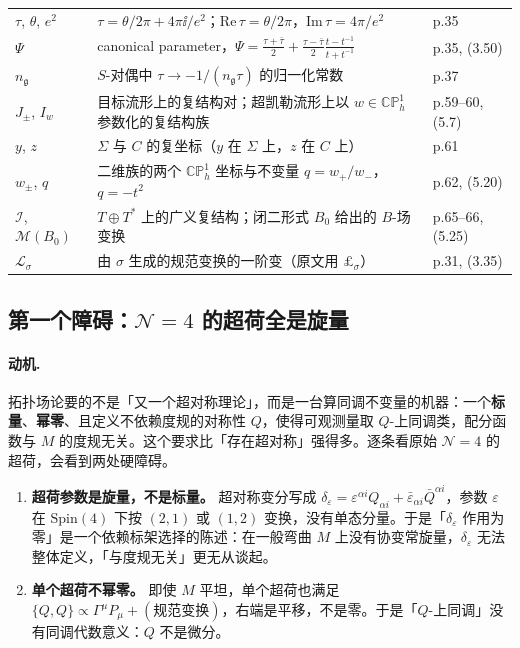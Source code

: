 {\begin{longtable}{@{}p{2.45cm}p{9.55cm}p{3.35cm}@{}}
$\tau$, $\theta$, $e^2$ & $\tau=\theta/2\pi+4\pi\ii/e^2$；$\mathrm{Re}\,\tau=\theta/2\pi$，$\mathrm{Im}\,\tau=4\pi/e^2$ & p.35\\
$\Psi$ & canonical parameter，$\Psi=\tfrac{\tau+\bar\tau}{2}+\tfrac{\tau-\bar\tau}{2}\tfrac{t-t^{-1}}{t+t^{-1}}$ & p.35, (3.50)\\
$n_{\mathfrak g}$ & $S$-对偶中 $\tau\to-1/(n_{\mathfrak g}\tau)$ 的归一化常数 & p.37\\
$J_\pm$, $I_w$ & 目标流形上的复结构对；超凯勒流形上以 $w\in\mathbb{CP}^1_h$ 参数化的复结构族 & p.59–60, (5.7)\\
$y$, $z$ & $\Sigma$ 与 $C$ 的复坐标（$y$ 在 $\Sigma$ 上，$z$ 在 $C$ 上） & p.61\\
$w_\pm$, $q$ & 二维族的两个 $\mathbb{CP}^1_h$ 坐标与不变量 $q=w_+/w_-$，$q=-t^2$ & p.62, (5.20)\\
$\mathcal I$, $\mathcal M(B_0)$ & $T\oplus T^*$ 上的广义复结构；闭二形式 $B_0$ 给出的 $B$-场变换 & p.65–66, (5.25)\\
$\mathcal L_\sigma$ & 由 $\sigma$ 生成的规范变换的一阶变（原文用 $\pounds_\sigma$） & p.31, (3.35)\\
\bottomrule
\end{longtable}
}

\subsection{第一个障碍：$\mathcal N=4$ 的超荷全是旋量}

\paragraph{动机.}
拓扑场论要的不是「又一个超对称理论」，而是一台算同调不变量的机器：一个\textbf{标量}、\textbf{幂零}、且定义不依赖度规的对称性 $Q$，使得可观测量取 $Q$-上同调类，配分函数与 $M$ 的度规无关。这个要求比「存在超对称」强得多。逐条看原始 $\mathcal N=4$ 的超荷，会看到两处硬障碍\pC。

\begin{enumerate}[label=(\arabic*)]
\item \textbf{超荷参数是旋量，不是标量。} 超对称变分写成 $\delta_\varepsilon=\varepsilon^{\alpha i}Q_{\alpha i}+\bar\varepsilon_{\alpha i}\bar Q^{\alpha i}$，参数 $\varepsilon$ 在 $\mathrm{Spin}(4)$ 下按 $(2,1)$ 或 $(1,2)$ 变换，没有单态分量。于是「$\delta_\varepsilon$ 作用为零」是一个依赖标架选择的陈述：在一般弯曲 $M$ 上没有协变常旋量，$\delta_\varepsilon$ 无法整体定义，「与度规无关」更无从谈起。
\item \textbf{单个超荷不幂零。} 即使 $M$ 平坦，单个超荷也满足 $\{Q,Q\}\propto \Gamma^\mu P_\mu+(\text{规范变换})$，右端是平移，不是零。于是「$Q$-上同调」没有同调代数意义：$Q$ 不是微分。
\end{enumerate}

